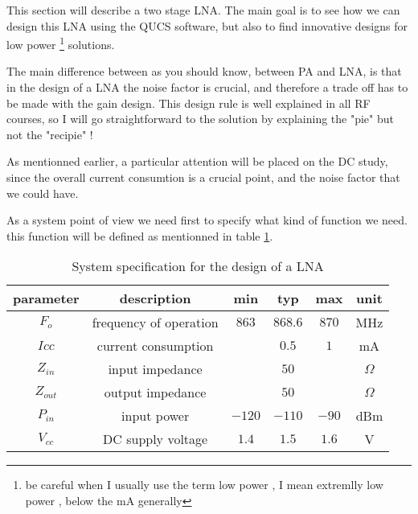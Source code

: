 %
%
%
%

This section will describe a two stage LNA. The main goal is to see how we can design this LNA using the QUCS software, but also to find innovative designs for low power \footnote{be careful when I usually use the term low power , I mean extremlly low power , below the mA generally} solutions.

\bigskip

The main difference between as you should know, between PA and LNA, is that in the design of a LNA the noise factor is crucial, and therefore a trade off has to be made with the gain design. This design rule is well explained in all RF courses, so I will go straightforward to the solution by explaining the "pie" but not the "recipie" !

\bigskip 

As mentionned earlier, a particular attention will be placed on the DC study, since the overall current consumtion is a crucial point, and the noise factor that we could have.


As a system point of view we need first to specify what kind of function we need. this function will be defined as mentionned in table \ref{design:lna:systemSpecification}.


\begin{table}[htdp]
\caption{System specification for the design of a LNA}
\begin{center}
\begin{tabular}{|c|c|c|c|c|c|} \hline
parameter & description 					& min   & typ     & max   & unit \\ \hline \hline
$F_o$     & frequency of operation		& $863$ & $868.6$ & $870$ & MHz \\
$Icc$ 	   & current consumption        &       &    $0.5$     & $1$    & mA \\ \hline
$Z_{in}$  & input impedance            &       & $50$    &        & $\Omega$ \\
$Z_{out}$  & output impedance            &       & $50$    &        & $\Omega$ \\ \hline
$P_{in}$   & input power                &   $-120$ & $-110$ & $-90$ & dBm \\
$V_{cc}$   & DC supply voltage                &   $1.4$ & $1.5$ & $1.6$ & V \\ \hline
\end{tabular}
\end{center}
\label{design:lna:systemSpecification}
\end{table}

